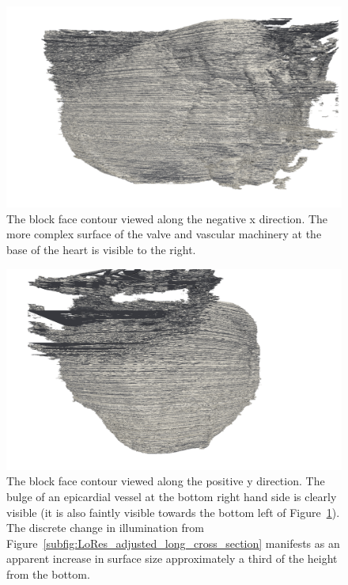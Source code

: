     \begin{figure}
      \centering
      \includegraphics[width=\textheight]{Ch6/Figs/Rat28/contours/LoRes_negative_x}
      \caption{The block face contour viewed along the negative x direction. The more complex surface of the valve and vascular machinery at the base of the heart is visible to the right.}
      \label{fig:LoRes_negative_x}
    \end{figure}
    
    \begin{figure}
      \centering
      \includegraphics[width=\textheight]{Ch6/Figs/Rat28/contours/LoRes_positive_y}
      \caption{The block face contour viewed along the positive y direction. The bulge of an epicardial vessel at the bottom right hand side is clearly visible (it is also faintly visible towards the bottom left of Figure~\ref{fig:LoRes_negative_x}). The discrete change in illumination from Figure~\ref{subfig:LoRes_adjusted_long_cross_section} manifests as an apparent increase in surface size approximately a third of the height from the bottom.}
      \label{fig:LoRes_positive_y}
    \end{figure}
    
